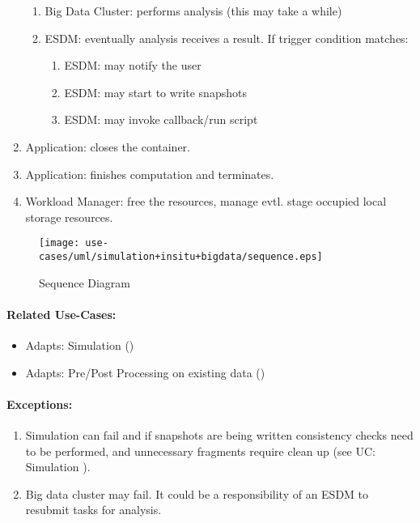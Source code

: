 \begin{enumerate}
\begin{enumerate}
		\item Big Data Cluster: performs analysis (this may take a while)
		\item ESDM: eventually analysis receives a result. If trigger condition matches:
		\begin{enumerate}
			\item ESDM: may notify the user
			\item ESDM: may start to write snapshots
			\item ESDM: may invoke callback/run script
		\end{enumerate}
	\end{enumerate}
	\item Application: closes the container.
	\item Application: finishes computation and terminates.
	\item Workload Manager: free the resources, manage evtl. stage occupied local storage resources.
\end{enumerate}



\begin{figure}
	\centering
	\texttt{[image: use-cases/uml/simulation+insitu+bigdata/sequence.eps]}
	\caption{Sequence Diagram}
	\label{fig:sequence simulation + big data + in-situ}
\end{figure}



\paragraph{Related Use-Cases:}
\begin{itemize}
	\item Adapts: Simulation ()
	\item Adapts: Pre/Post Processing on existing data ()
\end{itemize}






\paragraph{Exceptions:}
\begin{enumerate}
	\item Simulation can fail and if snapshots are being written consistency checks need to be performed, and unnecessary fragments require clean up (see UC: Simulation ).
	\item Big data cluster may fail. It could be a responsibility of an ESDM to resubmit tasks for analysis.
\end{enumerate}
